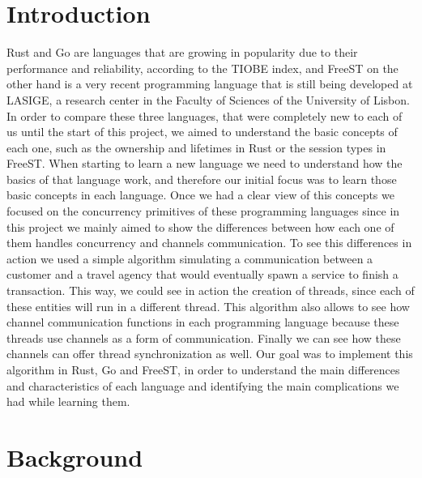 \documentclass[runningheads]{llncs}
\begin{document}
\section{Introduction}
Rust and Go are languages that are growing in popularity due to their performance and reliability, according to the TIOBE index, and FreeST\cite{freest} on the other hand is a very recent programming language that is still being developed at LASIGE, a research center in the Faculty of Sciences of the University of Lisbon. 
In order to compare these three languages, that were completely new to each of us until the start of this project, we aimed to understand the basic concepts of each one, such as the ownership and lifetimes in Rust or the session types \cite{session} in FreeST.
When starting to learn a new language we need to understand how the basics of that language work, and therefore our initial focus was to learn those basic concepts in each language. Once we had a clear view of this concepts we focused on the concurrency primitives of these programming languages since in this project we mainly aimed to show the differences between how each one of them handles concurrency and channels communication.
To see this differences in action we used a simple algorithm simulating a communication between a customer and a travel agency that would eventually spawn a service to finish a transaction. This way, we could see in action the creation of threads, since each of these entities will run in a different thread. This algorithm also allows to see how channel communication functions in each programming language because these threads use channels as a form of communication. Finally we can see how these channels can offer thread synchronization as well.
Our goal was to implement this algorithm in Rust, Go and FreeST, in order to understand the main differences and characteristics of each language and identifying the main complications we had while learning them.
\section{Background}
\end{document}
